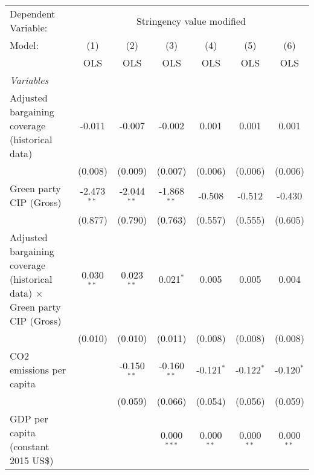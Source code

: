 
\begingroup
\centering
\begin{tabular}{lcccccc}
   \toprule
   Dependent Variable: & \multicolumn{6}{c}{Stringency value modified}\\
   Model:                                                                           & (1)           & (2)           & (3)           & (4)          & (5)          & (6)\\  
                                                                                    &  OLS          & OLS           & OLS           & OLS          & OLS          & OLS\\  
   \midrule
   \emph{Variables}\\
   Adjusted bargaining coverage (historical data)                                   & -0.011        & -0.007        & -0.002        & 0.001        & 0.001        & 0.001\\   
                                                                                    & (0.008)       & (0.009)       & (0.007)       & (0.006)      & (0.006)      & (0.006)\\   
   Green party CIP (Gross)                                                          & -2.473$^{**}$ & -2.044$^{**}$ & -1.868$^{**}$ & -0.508       & -0.512       & -0.430\\   
                                                                                    & (0.877)       & (0.790)       & (0.763)       & (0.557)      & (0.555)      & (0.605)\\   
   Adjusted bargaining coverage (historical data) $\times$ Green party CIP (Gross)  & 0.030$^{**}$  & 0.023$^{**}$  & 0.021$^{*}$   & 0.005        & 0.005        & 0.004\\   
                                                                                    & (0.010)       & (0.010)       & (0.011)       & (0.008)      & (0.008)      & (0.008)\\   
   CO2 emissions per capita                                                         &               & -0.150$^{**}$ & -0.160$^{**}$ & -0.121$^{*}$ & -0.122$^{*}$ & -0.120$^{*}$\\   
                                                                                    &               & (0.059)       & (0.066)       & (0.054)      & (0.056)      & (0.059)\\   
   GDP per capita (constant 2015 US\$)                                              &               &               & 0.000$^{***}$ & 0.000$^{**}$ & 0.000$^{**}$ & 0.000$^{**}$\\   

\end{tabular}
